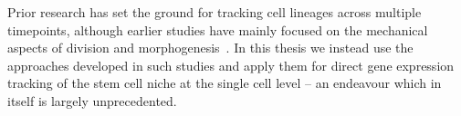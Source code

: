 Prior research has set the ground for tracking cell lineages across multiple
timepoints, although earlier studies have mainly focused on the mechanical aspects of
division and morphogenesis~\cite{willis2016cell}. In this thesis we instead use the
approaches developed in such studies and apply them for direct gene
expression tracking of the stem cell niche at the single cell level -- an endeavour which
in itself is largely unprecedented. 

